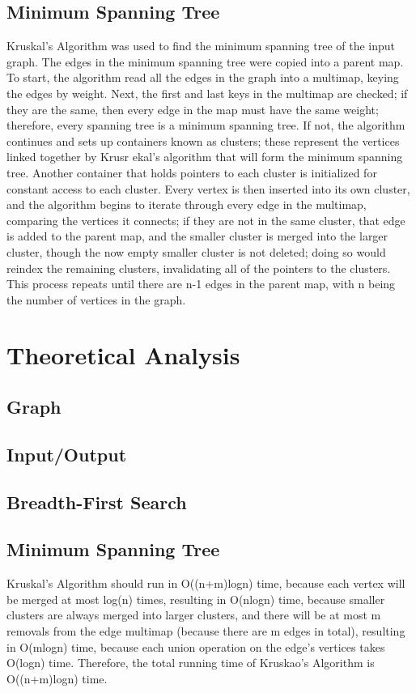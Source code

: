 \documentclass[titlepage]{article}
\begin{document}
\begin{multicols}{2}
			\subsection{Minimum Spanning Tree}
                        Kruskal's Algorithm was used to find the minimum spanning tree of the input graph. The edges in the minimum spanning tree were copied into a parent map. To start, the algorithm read all the edges in the graph into a multimap, keying the edges by weight. Next, the first and last keys in the multimap are checked; if they are the same, then every edge in the map must have the same weight; therefore, every spanning tree is a minimum spanning tree. If not, the algorithm continues and sets up containers known as clusters; these represent the vertices linked together by Krusr ekal's algorithm that will form the minimum spanning tree. Another container that holds pointers to each cluster is initialized for constant access to each cluster. Every vertex is then inserted into its own cluster, and the algorithm begins to iterate through every edge in the multimap, comparing the vertices it connects; if they are not in the same cluster, that edge is added to the parent map, and the smaller cluster is merged into the larger cluster, though the now empty smaller cluster is not deleted; doing so would reindex the remaining clusters, invalidating all of the pointers to the clusters. This process repeats until there are n-1 edges in the parent map, with n being the number of vertices in the graph.
		\section{Theoretical Analysis}
			\subsection{Graph}
			\subsection{Input/Output}
			\subsection{Breadth-First Search}
			\subsection{Minimum Spanning Tree}
                        Kruskal's Algorithm should run in O((n+m)logn) time, because each vertex will be merged at most log(n) times, resulting in O(nlogn) time, because smaller clusters are always merged into larger clusters, and there will be at most m removals from the edge multimap (because there are m edges in total), resulting in O(mlogn) time, because each union operation on the edge's vertices takes O(logn) time. Therefore, the total running time of Kruskao's Algorithm is O((n+m)logn) time.


\end{multicols}
\end{document}
